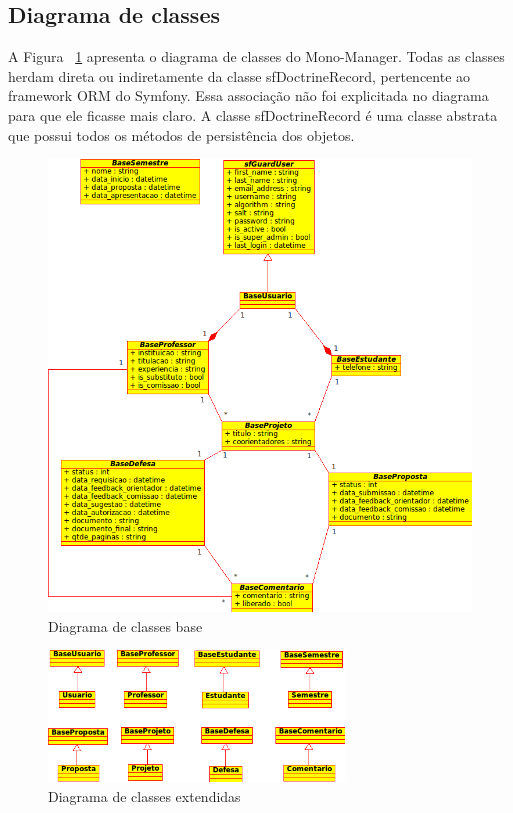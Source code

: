 \subsection{Diagrama de classes}

A Figura ~\ref{fig:diag_classes_base} apresenta o diagrama de classes do Mono-Manager. Todas as classes
herdam direta ou indiretamente da classe sfDoctrineRecord, pertencente ao framework ORM do Symfony. 
Essa associação não foi explicitada no diagrama para que ele ficasse mais claro. A classe sfDoctrineRecord
é uma classe abstrata que possui todos os métodos de persistência dos objetos.

\begin{figure}[htbp]
\centering
\includegraphics[width=1\textwidth]{fig/uml_classes_base.png}
\caption{Diagrama de classes base}
\label{fig:diag_classes_base}
\end{figure}

\begin{figure}[htbp]
\centering
\includegraphics[width=0.7\textwidth]{fig/uml_classes_principais.png}
\caption{Diagrama de classes extendidas}
\label{fig:diag_classes_principais}
\end{figure}

